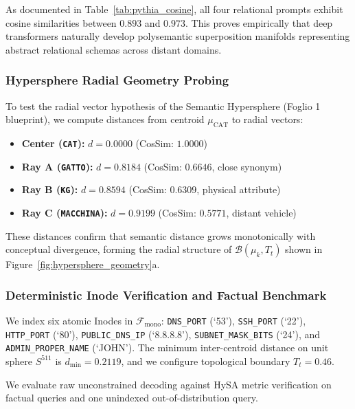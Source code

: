 \documentclass[10pt,twocolumn]{article}
\theoremstyle{definition}
\begin{document}
As documented in Table~\ref{tab:pythia_cosine}, all four relational prompts exhibit cosine similarities between $\mathbf{0.893}$ and $\mathbf{0.973}$. This proves empirically that deep transformers naturally develop polysemantic superposition manifolds representing abstract relational schemas across distant domains.

\subsubsection{Hypersphere Radial Geometry Probing}
To test the radial vector hypothesis of the Semantic Hypersphere (Foglio 1 blueprint), we compute distances from centroid $\mu_{\mathrm{CAT}}$ to radial vectors:
\begin{itemize}[leftmargin=*, itemsep=1.0pt]
    \item \textbf{Center (\texttt{CAT}):} $d = 0.0000$ (CosSim: $1.0000$)
    \item \textbf{Ray A (\texttt{GATTO}):} $d = 0.8184$ (CosSim: $0.6646$, close synonym)
    \item \textbf{Ray B (\texttt{KG}):} $d = 0.8594$ (CosSim: $0.6309$, physical attribute)
    \item \textbf{Ray C (\texttt{MACCHINA}):} $d = 0.9199$ (CosSim: $0.5771$, distant vehicle)
\end{itemize}
These distances confirm that semantic distance grows monotonically with conceptual divergence, forming the radial structure of $\mathcal{B}(\mu_k, T_t)$ shown in Figure~\ref{fig:hypersphere_geometry}a.

\subsubsection{Deterministic Inode Verification and Factual Benchmark}
We index six atomic Inodes in $\mathcal{F}_{\mathrm{mono}}$: \texttt{DNS\_PORT} (`53'), \texttt{SSH\_PORT} (`22'), \texttt{HTTP\_PORT} (`80'), \texttt{PUBLIC\_DNS\_IP} (`8.8.8.8'), \texttt{SUBNET\_MASK\_BITS} (`24'), and \texttt{ADMIN\_PROPER\_NAME} (`JOHN'). The minimum inter-centroid distance on unit sphere $S^{511}$ is $d_{\min} = 0.2119$, and we configure topological boundary $T_t = 0.46$.

We evaluate raw unconstrained decoding against HySA metric verification on factual queries and one unindexed out-of-distribution query.
\end{document}
